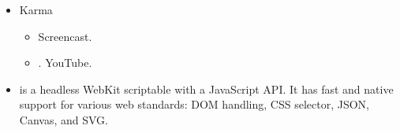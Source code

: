 \begin{itemize}
\begin{itemize}
\end{itemize}
\item Karma
\begin{itemize}
\item
{} Screencast.
\item
{}. YouTube.
\end{itemize}
\item
{}
is a headless WebKit scriptable with a JavaScript API. It has fast and native support for various web standards: DOM handling, CSS selector, JSON, Canvas, and SVG.
\end{itemize}

